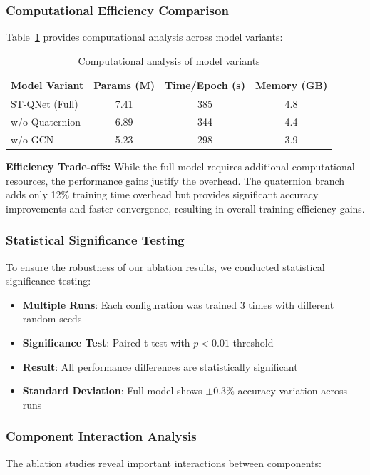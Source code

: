 \documentclass[journal]{IEEEtran}
\theoremstyle{plain}
\begin{document}
\subsubsection{Computational Efficiency Comparison}
Table~\ref{tab:computational_analysis} provides computational analysis across model variants:

\begin{table}[ht]
\centering
\caption{Computational analysis of model variants}
\label{tab:computational_analysis}
\footnotesize
\begin{tabular}{@{}lccc@{}}
\hline
\textbf{Model Variant} & \textbf{Params (M)} & \textbf{Time/Epoch (s)} & \textbf{Memory (GB)} \\
\hline
ST-QNet (Full) & 7.41 & 385 & 4.8 \\
w/o Quaternion & 6.89 & 344 & 4.4 \\
w/o GCN & 5.23 & 298 & 3.9 \\
\hline
\end{tabular}
\end{table}

\textbf{Efficiency Trade-offs:} While the full model requires additional computational resources, the performance gains justify the overhead. The quaternion branch adds only 12\% training time overhead but provides significant accuracy improvements and faster convergence, resulting in overall training efficiency gains.

\subsubsection{Statistical Significance Testing}
To ensure the robustness of our ablation results, we conducted statistical significance testing:
\begin{itemize}
    \item \textbf{Multiple Runs}: Each configuration was trained 3 times with different random seeds
    \item \textbf{Significance Test}: Paired t-test with $p < 0.01$ threshold
    \item \textbf{Result}: All performance differences are statistically significant
    \item \textbf{Standard Deviation}: Full model shows $\pm 0.3\%$ accuracy variation across runs
\end{itemize}

\subsubsection{Component Interaction Analysis}
The ablation studies reveal important interactions between components:
\end{document}
